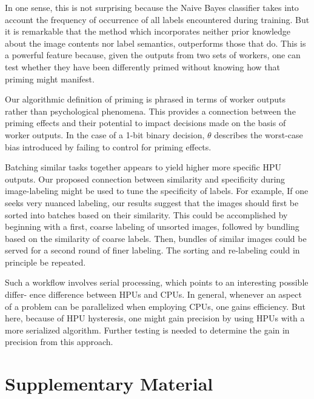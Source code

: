 \documentclass[12pt]{article}
\begin{document}
In one sense, this is not surprising because the Naive Bayes classifier takes 
into account the frequency of occurrence of all labels encountered during 
training. But it is remarkable that the method which incorporates neither 
prior knowledge about the image contents nor label semantics, outperforms 
those that do. This is a powerful feature because, given the outputs from two 
sets of workers, one can test whether they have been differently primed 
without knowing how that priming might manifest.

Our algorithmic definition of priming is phrased in terms of worker outputs 
rather than psychological phenomena. This provides a connection between the 
priming effects and their potential to impact decisions made on the basis of 
worker outputs. In the case of a 1-bit binary decision, $\theta$ describes the 
worst-case bias introduced by failing to control for priming effects.

Batching similar tasks together appears to yield higher more specific HPU 
outputs. Our proposed connection between similarity and specificity during 
image-labeling might be used to tune the specificity of labels. For example, 
If one seeks very nuanced labeling, our results suggest that the images 
should first be sorted into batches based on their similarity. This could be 
accomplished by beginning with a first, coarse labeling of unsorted images, 
followed by bundling based on the similarity of coarse labels. Then, bundles 
of similar images could be served for a second round of finer labeling. The 
sorting and re-labeling could in principle be repeated.

Such a workflow involves serial processing, which points to an interesting 
possible differ- ence difference between HPUs and CPUs. In general, whenever 
an aspect of a problem can be parallelized when employing CPUs, one gains 
efficiency. But here, because of HPU hysteresis, one might gain precision by 
using HPUs with a more serialized algorithm. Further testing is needed to 
determine the gain in precision from this approach.






\section*{Supplementary Material}
\end{document}
